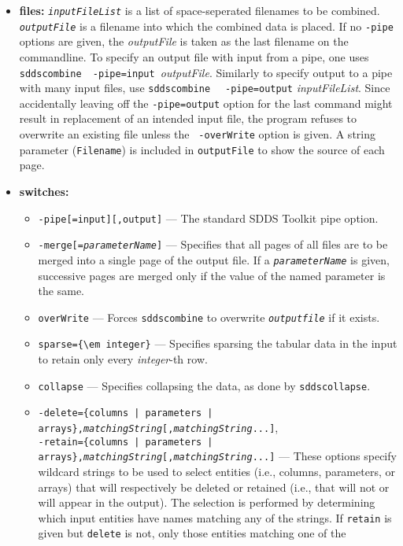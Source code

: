 \begin{itemize}
\item {\bf files:}
{\tt {\em inputFileList}} is a list of space-seperated filenames to be combined.  {\tt {\em outputFile}} is a filename
into which the combined data is placed.  If no {\tt -pipe} options are given, the {\em outputFile} is taken as the last
filename on the commandline.  To specify an output file with input from a pipe, one uses {\tt sddscombine }{\tt
-pipe=input }{\em outputFile}.  Similarly to specify output to a pipe with many input files, use {\tt sddscombine } {\tt
-pipe=output} {\em inputFileList}.  Since accidentally leaving off the {\tt -pipe=output} option for the last command
might result in replacement of an intended input file, the program refuses to overwrite an existing file unless the {\tt
-overWrite} option is given.  A string parameter ({\tt Filename}) is included in {\tt outputFile} to show the source of
each page.
\item {\bf switches:}
    \begin{itemize}
    \item {\tt -pipe[=input][,output]} --- The standard SDDS Toolkit pipe option.
    \item {\tt -merge[={\em parameterName}]} --- 
        Specifies that all pages of all files are to be merged into a single page
        of the output file.  If a {\tt {\em parameterName}} is given, successive pages are merged only if the
        value of the named parameter is the same.
    \item \verb|overWrite| --- Forces {\tt sddscombine} to overwrite {\tt {\em outputfile}} if it exists.
    \item \verb|sparse={\em integer}| --- Specifies sparsing the tabular data in the input to retain
        only every {\em integer}-th row.
    \item \verb|collapse| --- Specifies collapsing the data, as done by \verb|sddscollapse|.
    \item {\tt -delete=\{columns | parameters | arrays\},{\em matchingString}[,{\em matchingString}...]},\\
        {\tt -retain=\{columns | parameters | arrays\},{\em matchingString}[,{\em matchingString}...]}
         --- These options specify wildcard strings to be used to select entities
        (i.e., columns, parameters, or arrays) that will respectively be deleted or retained (i.e., that will not or
        will appear in the output).   
        The selection is performed by determining which input entities have names matching any of the strings.
        If \verb|retain| is given but \verb|delete| is not, only those entities matching one of the

\end{itemize}
\end{itemize}
